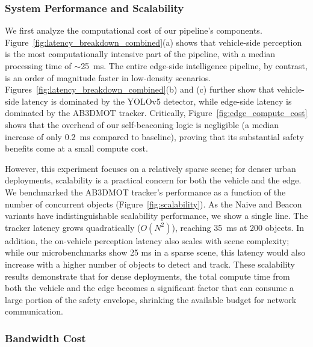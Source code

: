\subsubsection{System Performance and Scalability}
\label{sec:sys_perf}
We first analyze the computational cost of our pipeline's components. Figure~\ref{fig:latency_breakdown_combined}(a) shows that vehicle-side perception is the most computationally intensive part of the pipeline, with a median processing time of $\sim$25~ms. The entire edge-side intelligence pipeline, by contrast, is an order of magnitude faster in low-density scenarios. Figures~\ref{fig:latency_breakdown_combined}(b) and (c) further show that vehicle-side latency is dominated by the YOLOv5 detector, while edge-side latency is dominated by the AB3DMOT tracker. Critically, Figure~\ref{fig:edge_compute_cost} shows that the overhead of our self-beaconing logic is negligible (a median increase of only 0.2~ms compared to baseline), proving that its substantial safety benefits come at a small compute cost.

However, this experiment focuses on a relatively sparse scene; for denser urban deployments, scalability is a practical concern for both the vehicle and the edge. We benchmarked the AB3DMOT tracker's performance as a function of the number of concurrent objects (Figure~\ref{fig:scalability}). As the Naive and Beacon variants have indistinguishable scalability performance, we show a single line. The tracker latency grows quadratically ($O(N^2)$), reaching 35~ms at 200 objects. In addition, the on-vehicle perception latency also scales with scene complexity; while our microbenchmarks show 25 ms in a sparse scene, this latency would also increase with a higher number of objects to detect and track. These scalability results demonstrate that for dense deployments, the total compute time from both the vehicle and the edge becomes a significant factor that can consume a large portion of the safety envelope, shrinking the available budget for network communication.


\subsubsection{Bandwidth Cost}

